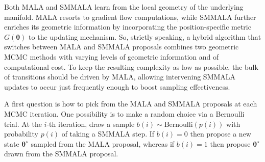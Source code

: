 \documentclass[twoside,11pt]{article}
\begin{document}
Both MALA and SMMALA learn from the local geometry of the underlying manifold. MALA resorts to gradient flow computations, 
while SMMALA further enriches its geometric information by incorporating the position-specific metric 
$G(\boldsymbol{\theta})$ to the updating mechanism. So, strictly speaking, a hybrid algorithm that switches between MALA and 
SMMALA proposals combines two geometric MCMC methods with varying levels of geometric information and of computational cost. 
To keep the resulting complexity as low as possible, the bulk of transitions should be driven by MALA, allowing intervening 
SMMALA updates to occur just frequently enough to boost sampling effectiveness.

A first question is how to pick from the MALA and SMMALA proposals at each MCMC iteration. One possibility is to make a
random choice via a Bernoulli trial. At the $i$-th iteration, draw a sample $b(i)\sim \mbox{Bernoulli}(p(i))$ with
probability $p(i)$ of taking a SMMALA step. If $b(i)=0$ then propose a new state $\boldsymbol{\theta}^{\star}$ sampled from
the MALA proposal, whereas if $b(i)=1$ then propose $\boldsymbol{\theta}^{\star}$ drawn from the SMMALA proposal.
\end{document}

